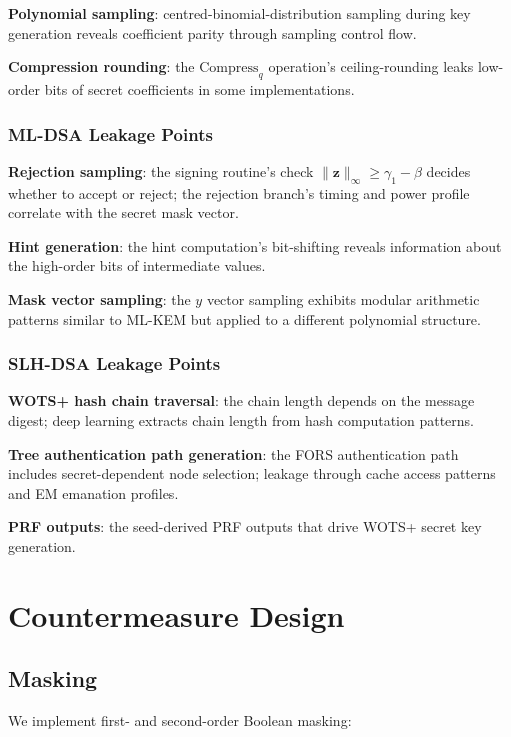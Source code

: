 \documentclass[sigconf,nonacm]{acmart}
\begin{document}
\textbf{Polynomial sampling}: centred-binomial-distribution sampling
during key generation reveals coefficient parity through sampling
control flow.

\textbf{Compression rounding}: the $\mathrm{Compress}_q$ operation's
ceiling-rounding leaks low-order bits of secret coefficients in some
implementations.

\subsubsection{ML-DSA Leakage Points}

\textbf{Rejection sampling}: the signing routine's check
$\|\mathbf{z}\|_\infty \geq \gamma_1 - \beta$ decides whether to
accept or reject; the rejection branch's timing and power profile
correlate with the secret mask vector.

\textbf{Hint generation}: the hint computation's bit-shifting reveals
information about the high-order bits of intermediate values.

\textbf{Mask vector sampling}: the $y$ vector sampling exhibits
modular arithmetic patterns similar to ML-KEM but applied to a
different polynomial structure.

\subsubsection{SLH-DSA Leakage Points}

\textbf{WOTS+ hash chain traversal}: the chain length depends on the
message digest; deep learning extracts chain length from hash
computation patterns.

\textbf{Tree authentication path generation}: the FORS authentication
path includes secret-dependent node selection; leakage through cache
access patterns and EM emanation profiles.

\textbf{PRF outputs}: the seed-derived PRF outputs that drive WOTS+
secret key generation.

\section{Countermeasure Design}

\subsection{Masking}

We implement first- and second-order Boolean masking:
\end{document}
